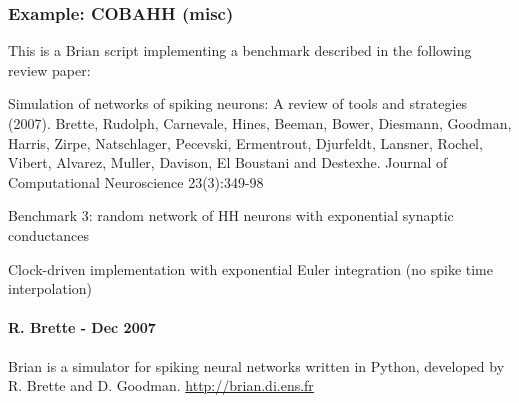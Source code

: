 \documentclass[letterpaper,10pt,english]{manual}
\begin{document}
\resetcurrentobjects
\hypertarget{--doc-examples-misc_COBAHH}{}

\hypertarget{index-52}{}\subsubsection{Example: COBAHH (misc)}

This is a Brian script implementing a benchmark described
in the following review paper:

Simulation of networks of spiking neurons: A review of tools and strategies (2007).
Brette, Rudolph, Carnevale, Hines, Beeman, Bower, Diesmann, Goodman, Harris, Zirpe,
Natschlager, Pecevski, Ermentrout, Djurfeldt, Lansner, Rochel, Vibert, Alvarez, Muller,
Davison, El Boustani and Destexhe.
Journal of Computational Neuroscience 23(3):349-98

Benchmark 3: random network of HH neurons with exponential synaptic conductances

Clock-driven implementation with exponential Euler integration
(no spike time interpolation)


\paragraph{R. Brette - Dec 2007}

Brian is a simulator for spiking neural networks written in Python, developed by
R. Brette and D. Goodman.
\href{http://brian.di.ens.fr}{http://brian.di.ens.fr}
\end{document}
